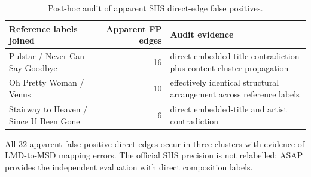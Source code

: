 \begin{table}[t]
\caption{Post-hoc audit of apparent SHS direct-edge false positives.}
\label{tab:shs-mapping-audit}
\centering
\scriptsize
\begin{tabular}{lrl}
\toprule
Reference labels joined & Apparent FP edges & Audit evidence \\
\midrule
Pulstar / Never Can Say Goodbye & 16 & direct embedded-title contradiction plus content-cluster propagation \\
Oh Pretty Woman / Venus & 10 & effectively identical structural arrangement across reference labels \\
Stairway to Heaven / Since U Been Gone & 6 & direct embedded-title and artist contradiction \\
\bottomrule
\end{tabular}
\vspace{2pt}
\begin{minipage}{\textwidth}
\footnotesize All 32 apparent false-positive direct edges occur in three clusters with evidence of LMD-to-MSD mapping errors. The official SHS precision is not relabelled; ASAP provides the independent evaluation with direct composition labels.
\end{minipage}
\end{table}
